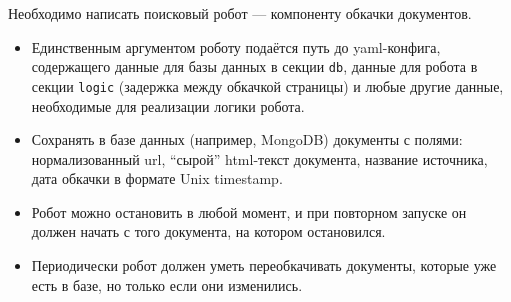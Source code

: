 
Необходимо написать поисковый робот --- компоненту обкачки документов.

\begin{itemize}
    \item Единственным аргументом роботу подаётся путь до yaml-конфига,
          содержащего данные для базы данных в секции \texttt{db}, данные для
          робота в секции \texttt{logic} (задержка между обкачкой страницы) и
          любые другие данные, необходимые для реализации логики робота.
    \item Сохранять в базе данных (например, MongoDB) документы с полями:
          нормализованный url, \enquote{сырой} html-текст документа, название
          источника, дата обкачки в формате Unix timestamp.
    \item Робот можно остановить в любой момент, и при повторном запуске он
          должен начать с того документа, на котором остановился.
    \item Периодически робот должен уметь переобкачивать документы, которые уже
          есть в базе, но только если они изменились.
\end{itemize}

\pagebreak
